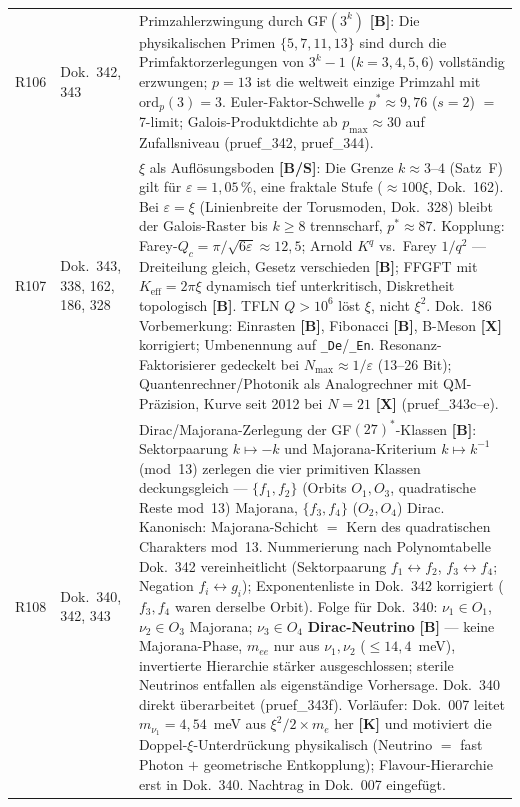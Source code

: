 \begin{longtable}{@{}p{0.9cm}p{3.1cm}p{10.2cm}@{}}
R106 & Dok.~342, 343 & Primzahlerzwingung durch GF$(3^k)$ \textbf{[B]}: Die physikalischen Primen $\{5,7,11,13\}$ sind durch die Primfaktorzerlegungen von $3^k-1$ ($k=3,4,5,6$) vollständig erzwungen; $p=13$ ist die weltweit einzige Primzahl mit $\text{ord}_p(3)=3$. Euler-Faktor-Schwelle $p^*\approx9{,}76$ ($s=2$) $=$ 7-limit; Galois-Produktdichte ab $p_\text{max}\approx30$ auf Zufallsniveau (pruef\_342, pruef\_344). \\
R107 & Dok.~343, 338, 162, 186, 328 & $\xi$ als Auflösungsboden \textbf{[B/S]}: Die Grenze $k\approx3$--$4$ (Satz~F) gilt für $\varepsilon=1{,}05\,\%$, eine fraktale Stufe ($\approx100\xi$, Dok.~162). Bei $\varepsilon=\xi$ (Linienbreite der Torusmoden, Dok.~328) bleibt der Galois-Raster bis $k\geq8$ trennscharf, $p^*\approx87$. Kopplung: Farey-$Q_c=\pi/\sqrt{6\varepsilon}\approx12{,}5$; Arnold $K^q$ vs.\ Farey $1/q^2$ --- Dreiteilung gleich, Gesetz verschieden \textbf{[B]}; FFGFT mit $K_\text{eff}=2\pi\xi$ dynamisch tief unterkritisch, Diskretheit topologisch \textbf{[B]}. TFLN $Q>10^6$ löst $\xi$, nicht $\xi^2$. Dok.~186 Vorbemerkung: Einrasten \textbf{[B]}, Fibonacci \textbf{[B]}, B-Meson \textbf{[X]} korrigiert; Umbenennung auf \texttt{\_De}/\texttt{\_En}. Resonanz-Faktorisierer gedeckelt bei $N_\text{max}\approx1/\varepsilon$ (13--26 Bit); Quantenrechner/Photonik als Analogrechner mit QM-Präzision, Kurve seit 2012 bei $N=21$ \textbf{[X]} (pruef\_343c--e). \\
R108 & Dok.~340, 342, 343 & Dirac/Majorana-Zerlegung der GF$(27)^*$-Klassen \textbf{[B]}: Sektorpaarung $k\mapsto-k$ und Majorana-Kriterium $k\mapsto k^{-1}$ (mod~13) zerlegen die vier primitiven Klassen deckungsgleich --- $\{f_1,f_2\}$ (Orbits $O_1,O_3$, quadratische Reste mod~13) Majorana, $\{f_3,f_4\}$ ($O_2,O_4$) Dirac. Kanonisch: Majorana-Schicht $=$ Kern des quadratischen Charakters mod~13. Nummerierung nach Polynomtabelle Dok.~342 vereinheitlicht (Sektorpaarung $f_1\leftrightarrow f_2$, $f_3\leftrightarrow f_4$; Negation $f_i\leftrightarrow g_i$); Exponentenliste in Dok.~342 korrigiert ($f_3,f_4$ waren derselbe Orbit). Folge für Dok.~340: $\nu_1\in O_1$, $\nu_2\in O_3$ Majorana; $\nu_3\in O_4$ \textbf{Dirac-Neutrino} \textbf{[B]} --- keine Majorana-Phase, $m_{ee}$ nur aus $\nu_1,\nu_2$ ($\leq14{,}4$~meV), invertierte Hierarchie stärker ausgeschlossen; sterile Neutrinos entfallen als eigenständige Vorhersage. Dok.~340 direkt überarbeitet (pruef\_343f). Vorläufer: Dok.~007 leitet $m_{\nu_1}=4{,}54$~meV aus $\xi^2/2\times m_e$ her \textbf{[K]} und motiviert die Doppel-$\xi$-Unterdrückung physikalisch (Neutrino $=$ fast Photon $+$ geometrische Entkopplung); Flavour-Hierarchie erst in Dok.~340. Nachtrag in Dok.~007 eingefügt. \\

\end{longtable}
